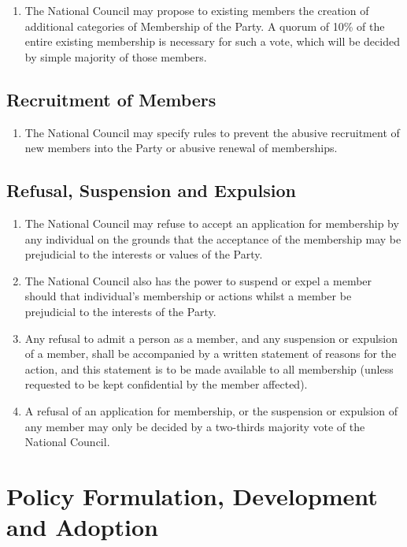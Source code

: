 \documentclass[a4paper,titlepage,8.5pt]{article}
\begin{document}
\begin{enumerate}
\item The National Council may propose to existing members the creation of additional categories of Membership of the Party. A quorum of 10\% of the entire existing membership is necessary for such a vote, which will be decided by simple majority of those members.
\end{enumerate}

\subsection{Recruitment of Members}

\begin{enumerate}
\item The National Council may specify rules to prevent the abusive recruitment of new members into the Party or abusive renewal of memberships.
\end{enumerate}

\subsection{Refusal, Suspension and Expulsion}

\begin{enumerate}
\item The National Council may refuse to accept an application for membership by any individual on the grounds that the acceptance of the membership may be prejudicial to the interests or values of the Party.
\item The National Council also has the power to suspend or expel a member should that individual’s membership or actions whilst a member be prejudicial to the interests of the Party.
\item Any refusal to admit a person as a member, and any suspension or expulsion of a member, shall be accompanied by a written statement of reasons for the action, and this statement is to be made available to all membership (unless requested to be kept confidential by the member affected).
\item A refusal of an application for membership, or the suspension or expulsion of any member may only be decided by a two-thirds majority vote of the National Council.
\end{enumerate}


\section{Policy Formulation, Development and Adoption}
\end{document}
